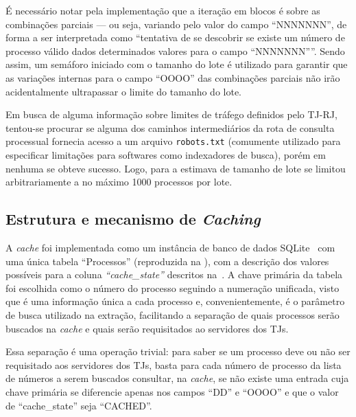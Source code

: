 É necessário notar pela implementação que a iteração em blocos é sobre as
combinações parciais --- ou seja, variando pelo valor do campo ``NNNNNNN'', de
forma a ser interpretada como ``tentativa de se descobrir se existe um número
de processo válido dados determinados valores para o campo ``NNNNNNN''''. Sendo
assim, um semáforo iniciado com o tamanho do lote é utilizado para garantir que
as variações internas para o campo ``OOOO'' das combinações parciais não irão
acidentalmente ultrapassar o limite do tamanho do lote.

Em busca de alguma informação sobre limites de tráfego definidos pelo TJ-RJ,
tentou-se procurar se alguma dos caminhos intermediários da rota de consulta
processual fornecia acesso a um arquivo \texttt{robots.txt} (comumente
utilizado para especificar limitações para softwares como indexadores de
busca), porém em nenhuma se obteve sucesso. Logo, para a estimava de tamanho de
lote se limitou arbitrariamente a no máximo 1000 processos por lote.

\subsection{Estrutura e mecanismo de \textit{Caching}}

A \textit{cache} foi implementada como um instância de banco de dados
SQLite~\cite{tool:sqlite} com uma única tabela ``Processos'' (reproduzida na
), com a descrição dos valores possíveis
para a coluna \textit{``cache\_state''} descritos
na~. A chave primária da tabela foi escolhida
como o número do processo seguindo a numeração unificada, visto que é uma
informação única a cada processo e, convenientemente, é o parâmetro de busca
utilizado na extração, facilitando a separação de quais processos serão
buscados na \textit{cache} e quais serão requisitados ao servidores dos TJs.

Essa separação é uma operação trivial: para saber se um processo deve ou não
ser requisitado aos servidores dos TJs, basta para cada número de processo da
lista de números a serem buscados consultar, na \textit{cache}, se não existe
uma entrada cuja chave primária se diferencie apenas nos campos ``DD'' e
``OOOO'' e que o valor de ``cache\_state'' seja ``CACHED''.

